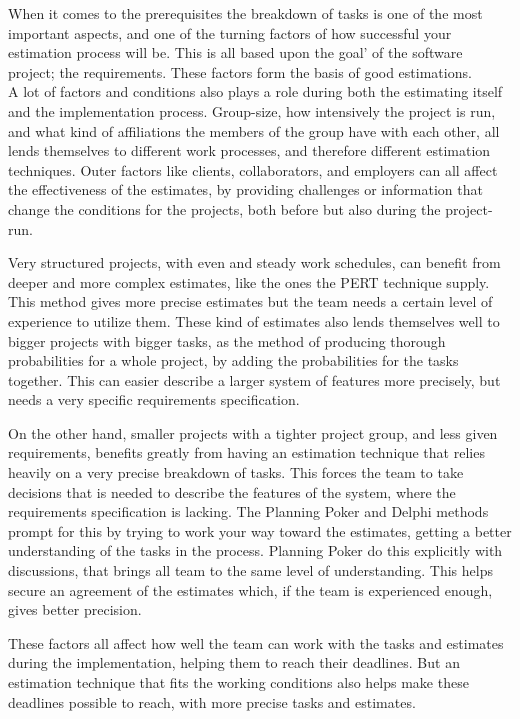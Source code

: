 When it comes to the prerequisites the breakdown of tasks is one of the most important aspects, and one of the turning factors of how successful your estimation process will be. This is all based upon the goal' of the software project; the requirements. These factors form the basis of good estimations.\\

A lot of factors and conditions also plays a role during both the estimating itself and the implementation process. Group-size, how intensively the project is run, and what kind of affiliations the members of the group have with each other, all lends themselves to different work processes, and therefore different estimation techniques. Outer factors like clients, collaborators, and employers can all affect the effectiveness of the estimates, by providing challenges or information that change the conditions for the projects, both before but also during the project-run. 

Very structured projects, with even and steady work schedules, can benefit from deeper and more complex estimates, like the ones the PERT technique supply. This method gives more precise estimates but the team needs a certain level of experience to utilize them. These kind of estimates also lends themselves well to bigger projects with bigger tasks, as the method of producing thorough probabilities for a whole project, by adding the probabilities for the tasks together. This can easier describe a larger system of features more precisely, but needs a very specific requirements specification.

On the other hand, smaller projects with a tighter project group, and less given requirements, benefits greatly from having an estimation technique that relies heavily on a very precise breakdown of tasks. This forces the team to take decisions that is needed to describe the features of the system, where the requirements specification is lacking. The Planning Poker and Delphi methods prompt for this by trying to work your way toward the estimates, getting a better understanding of the tasks in the process. Planning Poker do this explicitly with discussions, that brings all team to the same level of understanding. This helps secure an agreement of the estimates which, if the team is experienced enough, gives better precision.

These factors all affect how well the team can work with the tasks and estimates during the implementation, helping them to reach their deadlines. But an estimation technique that fits the working conditions also helps make these deadlines possible to reach, with more precise tasks and estimates.\\


